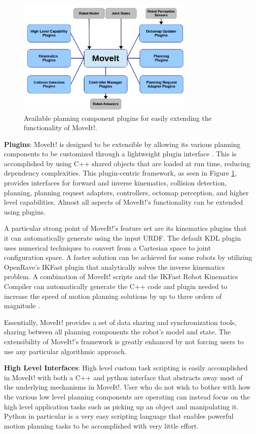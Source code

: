 \documentclass[10pt,journal,compsoc]{joser1}
\begin{document}
{\begin{figure}[!t]
\centering
\includegraphics[width=3.4in]{images/moveit_plugins}
\caption{Available planning component plugins for easily extending the functionality of MoveIt!.}
\label{fig:moveit_plugins}
\end{figure}

{\bf Plugins}: MoveIt! is designed to be extensible by allowing its various planning components to be customized through a lightweight plugin interface \cite{moveit}. This is accomplished by using C++ shared objects that are loaded at run time, reducing dependency complexities. This plugin-centric framework, as seen in Figure \ref{fig:moveit_plugins}, provides interfaces for forward and inverse kinematics, collision detection, planning, planning request adapters, controllers, octomap perception, and higher level capabilities. Almost all aspects of MoveIt!'s functionality can be extended using plugins.

A particular strong point of MoveIt!'s feature set are its kinematics plugins that it can automatically generate using the input URDF. The default KDL plugin uses numerical techniques to convert from a Cartesian space to joint configuration space. A faster solution can be achieved for some robots by utilizing OpenRave's IKFast \cite{ikfast} plugin that analytically solves the inverse kinematics problem. A combination of MoveIt! scripts and the IKFast Robot Kinematics Compiler can automatically generate the C++ code and plugin needed to increase the speed of motion planning solutions by up to three orders of magnitude \cite{ikfast}.

Essentially, MoveIt! provides a set of data sharing and synchronization tools, sharing between all planning components the robot's model and state. The extensibility of MoveIt!'s framework is greatly enhanced by not forcing users to use any particular algorithmic approach. 

{\bf High Level Interfaces}: High level custom task scripting is easily accomplished in MoveIt! with both a C++ and python interface that abstracts away most of the underlying mechanisms in MoveIt!. User who do not wish to bother with how the various low level planning components are operating can instead focus on the high level application tasks such as picking up an object and manipulating it. Python in particular is a very easy scripting language that enables powerful motion planning tasks to be accomplished with very little effort.

}
\end{document}
